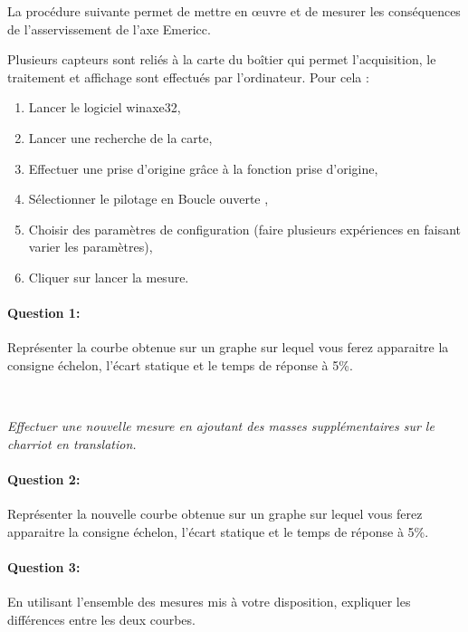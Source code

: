 

\ifdef{\public}{\cleardoublepage}{}

\ifdef{\public}{\cleardoublepage}{}



La procédure suivante permet de mettre en \oe uvre et de mesurer les conséquences de l'asservissement de l'axe Emericc.

Plusieurs capteurs sont reliés à la carte du boîtier qui permet l'acquisition, le traitement et affichage sont effectués par l'ordinateur. Pour cela :
\begin{enumerate}
 \item Lancer le logiciel winaxe32,
 \item Lancer une recherche de la carte,
 \item Effectuer une prise d'origine grâce à la fonction \og prise d'origine\fg,
 \item Sélectionner le pilotage en \og Boucle ouverte \fg,
 \item Choisir des paramètres de configuration (faire plusieurs expériences en faisant varier les paramètres),
 \item Cliquer sur lancer la mesure.
\end{enumerate} 

\paragraph{Question 1:} Représenter la courbe obtenue sur un graphe sur lequel vous ferez apparaitre la consigne échelon, l'écart statique et le temps de réponse à 5\%.

~\

\textit{Effectuer une nouvelle mesure en ajoutant des masses supplémentaires sur le charriot en translation.}

\paragraph{Question 2:} Représenter la nouvelle courbe obtenue sur un graphe sur lequel vous ferez apparaitre la consigne échelon, l'écart statique et le temps de réponse à 5\%.

\paragraph{Question 3:} En utilisant l'ensemble des mesures mis à votre disposition, expliquer les différences entre les deux courbes.

